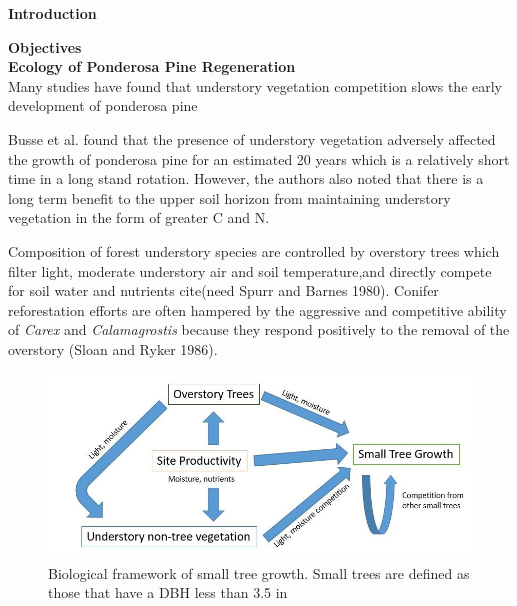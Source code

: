 \documentclass[11pt, letterpaper, fleqn]{article}
\begin{document}
\newpage
{}
\setcounter{page}{1}
\large 
\begin{center}
\textbf{Introduction}\\[1pt]
\end{center}
\normalsize
\noindent 
{}
\textbf{Objectives}\\[1pt]
\textbf{Ecology of Ponderosa Pine Regeneration}\\[1pt]


Many studies have found that understory vegetation competition slows the early development of ponderosa pine  

Busse et al. found that the presence of understory vegetation adversely affected the growth of ponderosa pine for an estimated 20 years which is a relatively short time in a long stand rotation\cite{Busse1996}. However, the authors also noted that there is a long term benefit to the upper soil horizon from maintaining understory vegetation in the form of greater C and N.

Composition of forest understory species are controlled by overstory trees which filter light, moderate understory air and soil temperature,and directly compete for soil water and nutrients cite(need Spurr and Barnes 1980). Conifer reforestation efforts are often hampered by the aggressive and competitive ability of \emph{Carex} and \emph{Calamagrostis} because they respond positively to the removal of the overstory (Sloan and Ryker 1986). 





\begin{figure}[h]
\begin{center}
    \includegraphics[width=160mm]{comp_flowchart.jpg}
    \caption{Biological framework of small tree growth. Small trees are defined as those that have a DBH less than 3.5 in}
    \label{fig:chart}
\end{center}
\end{figure}
\end{document}
